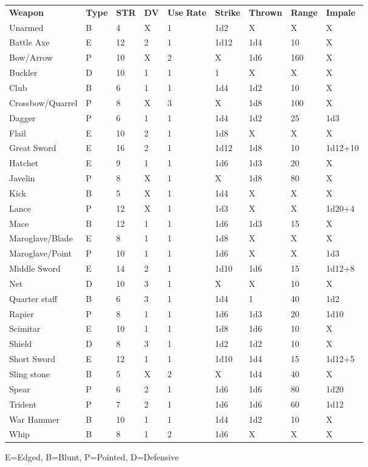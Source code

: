 \label{playing-weapon-table}
\begin{normbox}
\begin{tabular}{l l l l l l l l l}
\textbf{Weapon} & \textbf{Type} & \textbf{STR} & \textbf{DV} & \textbf{Use} \textbf{Rate} & \textbf{Strike} & \textbf{Thrown} & \textbf{Range} & \textbf{Impale}\\
Unarmed & B & 4 & X & 1 & 1d2 & X & X & X\\
Battle Axe & E & 12 & 2 & 1 & 1d12 & 1d4 & 10 & X\\
Bow/Arrow & P & 10 & X & 2 & X & 1d6 & 160 & X\\
Buckler & D & 10 & 1 & 1 & 1 & X & X & X\\
Club & B & 6 & 1 & 1 & 1d4 & 1d2 & 10 & X\\
Crossbow/Quarrel & P & 8 & X & 3 & X & 1d8 & 100 & X\\
Dagger & P & 6 & 1 & 1 & 1d4 & 1d2 & 25 & 1d3\\
Flail & E & 10 & 2 & 1 & 1d8 & X & X & X\\
Great Sword & E & 16 & 2 & 1 & 1d12 & 1d8 & 10 & 1d12+10\\
Hatchet & E & 9 & 1 & 1 & 1d6 & 1d3 & 20 & X\\
Javelin & P & 8 & X & 1 & X & 1d8 & 80 & X\\
Kick & B & 5 & X & 1 & 1d4 & X & X & X\\
Lance & P & 12 & X & 1 & 1d3 & X & X & 1d20+4\\
Mace & B & 12 & 1 & 1 & 1d6 & 1d3 & 15 & X\\
Maroglave/Blade & E & 8 & 1 & 1 & 1d8 & X & X & X\\
Maroglave/Point & P & 10 & 1 & 1 & 1d6 & X & X & 1d3\\
Middle Sword & E & 14 & 2 & 1 & 1d10 & 1d6 & 15 & 1d12+8\\
Net & D & 10 & 3 & 1 & X & X & 10 & X\\
Quarter staff & B & 6 & 3 & 1 & 1d4 & 1 & 40 & 1d2\\
Rapier & P & 8 & 1 & 1 & 1d6 & 1d3 & 20 & 1d10\\
Scimitar & E & 10 & 1 & 1 & 1d8 & 1d6 & 10 & X\\
Shield & D & 8 & 3 & 1 & 1d2 & 1d2 & 10 & X\\
Short Sword & E & 12 & 1 & 1 & 1d10 & 1d4 & 15 & 1d12+5\\
Sling stone & B & 5 & X & 2 & X & 1d4 & 40 & X\\
Spear & P & 6 & 2 & 1 & 1d6 & 1d6 & 80 & 1d20\\
Trident & P & 7 & 2 & 1 & 1d6 & 1d6 & 60 & 1d12\\
War Hammer & B & 10 & 1 & 1 & 1d4 & 1d2 & 10 & X\\
Whip & B & 8 & 1 & 2 & 1d6 & X & X & X\\
\end{tabular}
\end{normbox}
E=Edged, B=Blunt, P=Pointed, D=Defensive